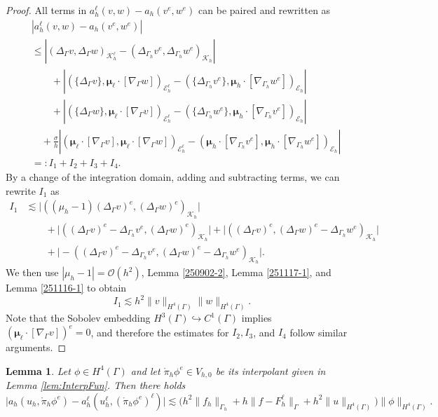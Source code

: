 \documentclass[10pt, a4paper]{amsart}
\newcommand{\nab}{\nabla}
\newcommand{\bmu}{{\bm \mu}}
\newcommand{\calE}{\mathcal{E}}
\newcommand{\calK}{\mathcal{K}}
\newcommand{\calO}{\mathcal{O}}
\newtheorem{lemma}[theorem]{Lemma}
\theoremstyle{definition}
\theoremstyle{remark}
\theoremstyle{example}
\numberwithin{equation}{section}
\begin{document}
\begin{proof}
All terms in $a_h^\ell(v, w) - a_h(v^e, w^e)$ can be paired and rewritten as
\begin{align*}
& |a_h^\ell(v, w) - a_h(v^e, w^e)| \\
& \le \left|(\Delta_{\Gamma}v, \Delta_{\Gamma}w)_{\calK^\ell_h} - (\Delta_{\Gamma_h}v^e, \Delta_{\Gamma_h}w^e)_{\calK_h}\right| \\
& \qquad + \left|(\{\Delta_{\Gamma}v\}, \bmu_{\ell} \cdot [\nab_{\Gamma}w])_{\calE_h^\ell} - (\{\Delta_{\Gamma_h}v^e\}, \bmu_h \cdot [\nab_{\Gamma_h}w^e])_{\calE_h}\right| \\
& \qquad + \left|(\{\Delta_{\Gamma}w\}, \bmu_{\ell} \cdot [\nab_{\Gamma}v])_{\calE_h^\ell} - (\{\Delta_{\Gamma_h}w^e\}, \bmu_h \cdot [\nab_{\Gamma_h}v^e])_{\calE_h}\right| \\
& \quad + \frac{\sigma}{h}\left|(\bmu_{\ell} \cdot [\nab_{\Gamma}v], \bmu_{\ell} \cdot [\nab_{\Gamma}w])_{\calE_h^\ell} - (\bmu_h \cdot [\nab_{\Gamma_h}v^e], \bmu_h \cdot [\nab_{\Gamma_h}w^e])_{\calE_h}\right| \\
& =: I_1 + I_2 + I_3 + I_4.
\end{align*}
By a change of the integration domain, adding and subtracting terms, we can rewrite $I_1$  as
\begin{align*}
I_1
& \lesssim \Big|((\mu_h - 1)(\Delta_{\Gamma}v)^e, (\Delta_{\Gamma}w)^e)_{\calK_h}\Big| \\
& \qquad + \Big|((\Delta_{\Gamma}v)^e - \Delta_{\Gamma_h}v^e, (\Delta_{\Gamma}w)^e)_{\calK_h}\Big| + \Big|((\Delta_{\Gamma}v)^e, (\Delta_{\Gamma}w)^e - \Delta_{\Gamma_h}w^e)_{\calK_h}\Big| \\
& \qquad + \Big| - ((\Delta_{\Gamma}v)^e - \Delta_{\Gamma_h}v^e, (\Delta_{\Gamma}w)^e - \Delta_{\Gamma_h}w^e)_{\calK_h}\Big|.
\end{align*}
We then use $|\mu_h - 1| = \calO(h^2)$, Lemma \ref{250902-2}, Lemma \ref{251117-1}, and Lemma \ref{251116-1} to obtain
\[
I_1
\lesssim h^2\|v\|_{H^4(\Gamma)}\|w\|_{H^4(\Gamma)}.
\]
Note that the Sobolev embedding $H^3(\Gamma) \hookrightarrow C^1(\Gamma)$ implies $(\bmu_\ell \cdot [\nab_\Gamma v])^e = 0$, and therefore the estimates for $I_2, I_3$, and $I_4$ follow similar arguments.
\end{proof}




\begin{lemma} \label{lem:GDiffer}
Let $\phi \in H^4(\Gamma)$ and let $\mathring{\pi}_h\phi^e \in V_{h, 0}$ be its interpolant given in Lemma \ref{lem:InterpFun}. Then there holds
\begin{equation} \label{eqn:GDiffABC}
\big|a_h(u_h, \mathring{\pi}_h\phi^e) - a_h^\ell(u_h^\ell, (\mathring{\pi}_h\phi^e)^\ell)\big|
\lesssim \big(h^2\|f_h\|_{\Gamma_h} + h\|f - F_h^\ell\|_\Gamma + h^2\|u\|_{H^4(\Gamma)}\big)\|\phi\|_{H^4(\Gamma)}.
\end{equation}
\end{lemma}
\end{document}
